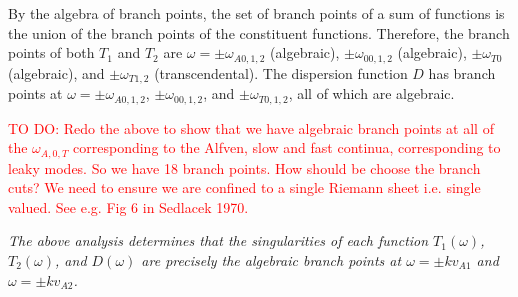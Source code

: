 \documentclass[12pt]{../style-files/ociamthesis}
\begin{document}
By the algebra of branch points, the set of branch points of a sum of functions is the union of the branch points of the constituent functions. Therefore, the branch points of both $T_1$ and $T_2$ are $\omega = \pm \omega_{A0,1,2}$ (algebraic), $\pm \omega_{00,1,2}$ (algebraic), $\pm \omega_{T0}$ (algebraic), and $\pm \omega_{T1,2}$ (transcendental). The dispersion function $D$ has branch points at $\omega = \pm \omega_{A0,1,2}$, $\pm \omega_{00,1,2}$, and $\pm \omega_{T0,1,2}$, all of which are algebraic.

\textcolor{red}{TO DO: Redo the above to show that we have algebraic branch points at all of the $\omega_{A,0,T}$ corresponding to the Alfven, slow and fast continua, corresponding to leaky modes. So we have 18 branch points. How should be choose the branch cuts? We need to ensure we are confined to a single Riemann sheet i.e. single valued. See e.g. Fig 6 in Sedlacek 1970.}

\textit{The above analysis determines that the singularities of each function $T_1(\omega)$, $T_2(\omega)$, and $D(\omega)$ are precisely the algebraic branch points at $\omega = \pm kv_{A1}$ and $\omega = \pm kv_{A2}$.}
\end{document}
